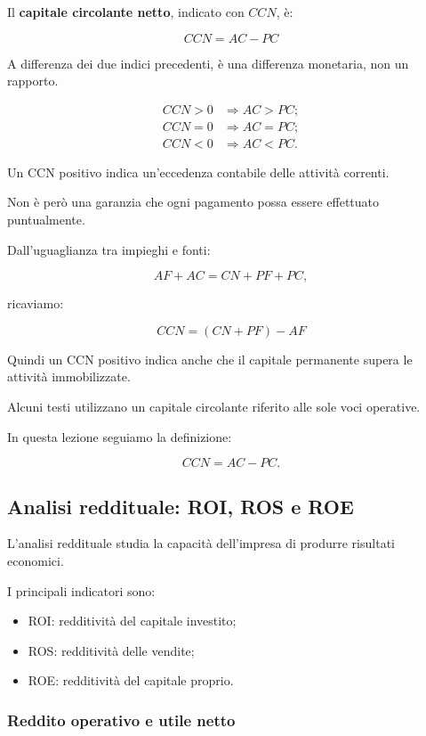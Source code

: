 \noindent Il \textbf{capitale circolante netto},
indicato con $CCN$, è:

\[
\boxed{
CCN=AC-PC
}
\]

\noindent A differenza dei due indici precedenti,
è una differenza monetaria,
non un rapporto.

\[
\begin{aligned}
CCN>0
&\Rightarrow AC>PC;\\
CCN=0
&\Rightarrow AC=PC;\\
CCN<0
&\Rightarrow AC<PC.
\end{aligned}
\]

\noindent Un CCN positivo
indica un'eccedenza contabile
delle attività correnti.

\noindent Non è però una garanzia
che ogni pagamento
possa essere effettuato puntualmente.

\medskip

\noindent Dall'uguaglianza
tra impieghi e fonti:

\[
AF+AC=CN+PF+PC,
\]

\noindent ricaviamo:

\[
\boxed{
CCN=(CN+PF)-AF
}
\]

\noindent Quindi un CCN positivo
indica anche che il capitale permanente
supera le attività immobilizzate.

\medskip

\noindent Alcuni testi utilizzano
un capitale circolante
riferito alle sole voci operative.

\noindent In questa lezione
seguiamo la definizione:

\[
CCN=AC-PC.
\]


\subsection{Analisi reddituale: ROI, ROS e ROE}

\noindent L'analisi reddituale
studia la capacità dell'impresa
di produrre risultati economici.

\noindent I principali indicatori sono:

\begin{itemize}
    \item ROI: redditività del capitale investito;
    \item ROS: redditività delle vendite;
    \item ROE: redditività del capitale proprio.
\end{itemize}


\subsubsection*{Reddito operativo e utile netto}

